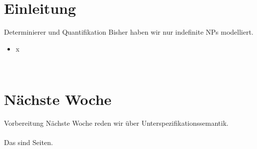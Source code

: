 \section{Einleitung}

\begin{frame}
  {Determinierer und Quantifikation}
  \onslide<+->
  \onslide<+->
  Bisher haben wir nur indefinite NPs modelliert.\\
  \Zeile
  \begin{itemize}[<+->]
    \item x
  \end{itemize}
  \Zeile
  \onslide<+->
  \centering 
  \\
\end{frame}


\section{Nächste Woche}

\begin{frame}
  {Vorbereitung}
  \onslide<+->
  \onslide<+->
  \centering 
  \large
  Nächste Woche reden wir über Unterspezifikationssemantik.\\
  \onslide<+->
  \Zeile
  \\
  \onslide<+->
  \Viertelzeile
  Das sind  Seiten.\\
\end{frame}
